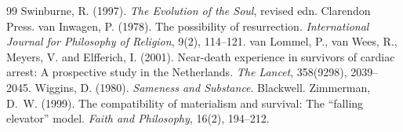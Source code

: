\documentclass{situationist-preprint}
\begin{document}
\begin{thebibliography}{99}
 Swinburne, R. (1997). \emph{The Evolution of the Soul}, revised edn. Clarendon Press.
 van Inwagen, P. (1978). The possibility of resurrection. \emph{International Journal for Philosophy of Religion}, 9(2), 114--121.
 van Lommel, P., van Wees, R., Meyers, V. and Elfferich, I. (2001). Near-death experience in survivors of cardiac arrest: A prospective study in the Netherlands. \emph{The Lancet}, 358(9298), 2039--2045.
 Wiggins, D. (1980). \emph{Sameness and Substance}. Blackwell.
 Zimmerman, D.~W. (1999). The compatibility of materialism and survival: The \enquote{falling elevator} model. \emph{Faith and Philosophy}, 16(2), 194--212.
\end{thebibliography}
\end{document}

